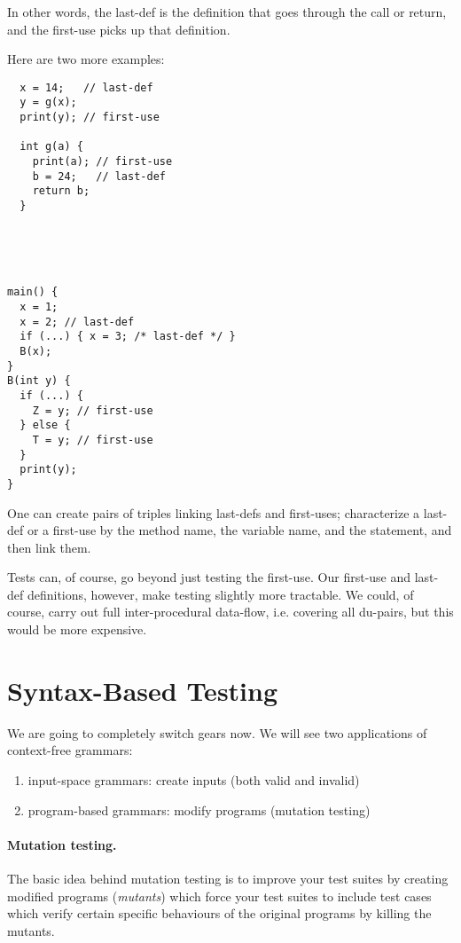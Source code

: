 \documentclass[11pt]{article}
\begin{document}
In other words, the last-def is the definition that goes through the call
or return, and the first-use picks up that definition.

\newpage
Here are two more examples:
\begin{multicols}{2}{
\begin{verbatim}
  x = 14;   // last-def
  y = g(x);
  print(y); // first-use

  int g(a) {
    print(a); // first-use
    b = 24;   // last-def
    return b;
  }



  
\end{verbatim}
}{
\begin{verbatim}
main() {
  x = 1;
  x = 2; // last-def
  if (...) { x = 3; /* last-def */ }
  B(x);
}
B(int y) {
  if (...) {
    Z = y; // first-use
  } else {
    T = y; // first-use
  }
  print(y);
}
\end{verbatim}
}
\end{multicols}

One can create pairs of triples linking last-defs and first-uses;
characterize a last-def or a first-use by the method name, the
variable name, and the statement, and then link them.

Tests can, of course, go beyond just testing the first-use.
Our first-use and last-def definitions, however, make testing
slightly more tractable. We could, of course, carry out full
inter-procedural data-flow, i.e. covering all du-pairs,
but this would be more expensive.

\section*{Syntax-Based Testing}
We are going to completely switch gears now. We will see two applications of context-free grammars:
\begin{enumerate}
\item input-space grammars: create inputs (both valid and invalid)
\item program-based grammars: modify programs (mutation testing)
\end{enumerate}


\paragraph{Mutation testing.} The basic idea behind mutation testing is to improve your test suites
by creating modified programs (\emph{mutants}) which force your test suites
to include test cases which verify certain specific behaviours of the
original programs by killing the mutants.
\end{document}
